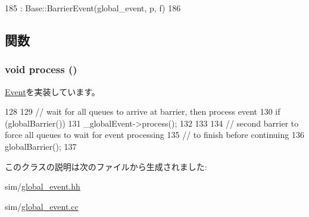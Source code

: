 \begin{DoxyCode}
185             : Base::BarrierEvent(global_event, p, f)
186         { }
\end{DoxyCode}


\subsection{関数}
\hypertarget{classGlobalEvent_1_1BarrierEvent_a2e9c5136d19b1a95fc427e0852deab5c}{
\subsubsection[{process}]{\setlength{\rightskip}{0pt plus 5cm}void process ()}}
\label{classGlobalEvent_1_1BarrierEvent_a2e9c5136d19b1a95fc427e0852deab5c}


\hyperlink{classEvent_a142b75b68a6291400e20fb0dd905b1c8}{Event}を実装しています。


\begin{DoxyCode}
128 {
129     // wait for all queues to arrive at barrier, then process event
130     if (globalBarrier()) {
131         _globalEvent->process();
132     }
133 
134     // second barrier to force all queues to wait for event processing
135     // to finish before continuing
136     globalBarrier();
137 }
\end{DoxyCode}


このクラスの説明は次のファイルから生成されました:\begin{DoxyCompactItemize}
\item 
sim/\hyperlink{global__event_8hh}{global\_\-event.hh}\item 
sim/\hyperlink{global__event_8cc}{global\_\-event.cc}\end{DoxyCompactItemize}
